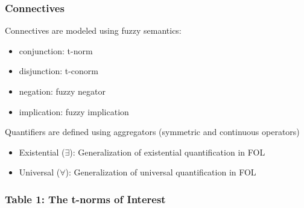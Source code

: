 \documentclass{beamer}
\begin{document}
\begin{frame}
  \frametitle{Connectives}
  Connectives are modeled using fuzzy semantics:
  \begin{itemize}
  \item conjunction: t-norm
  \item disjunction: t-conorm
  \item negation: fuzzy negator
  \item implication: fuzzy implication
  \end{itemize}
  Quantifiers are defined using aggregators (symmetric and continuous
  operators)
  \begin{itemize}
  \item Existential ($\exists$): Generalization of existential quantification in FOL
  \item Universal ($\forall$): Generalization of universal quantification in FOL
  \end{itemize}
\end{frame}

\begin{frame}
\frametitle{Table 1: The t-norms of Interest}
\end{frame}
\end{document}
